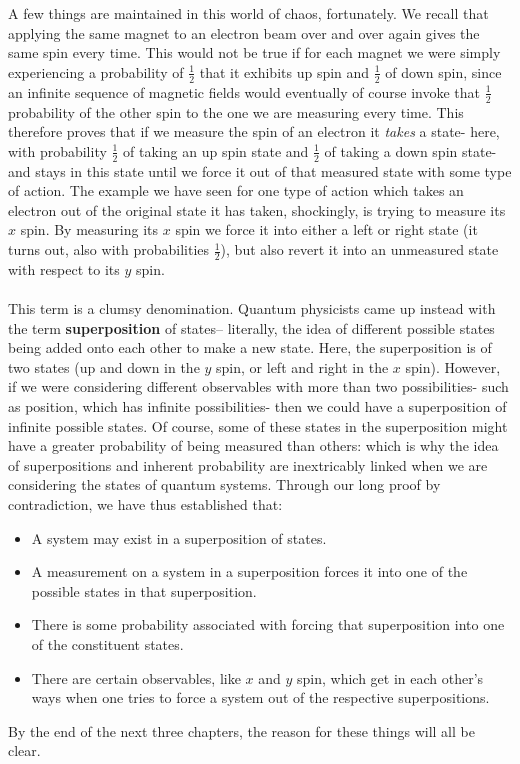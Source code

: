 \\\\
A few things are maintained in this world of chaos, fortunately. We recall that applying the same magnet to an electron beam over and over again gives the same spin every time. This would not be true if for each magnet we were simply experiencing a probability of $\frac{1}{2}$ that it exhibits up spin and $\frac{1}{2}$ of down spin, since an infinite sequence of magnetic fields would eventually of course invoke that $\frac{1}{2}$ probability of the other spin to the one we are measuring every time. This therefore proves that if we measure the spin of an electron it \textit{takes} a state- here, with probability $\frac{1}{2}$ of taking an up spin state and $\frac{1}{2}$ of taking a down spin state- and stays in this state until we force it out of that measured state with some type of action. The example we have seen for one type of action which takes an electron out of the original state it has taken, shockingly, is trying to measure its $x$ spin. By measuring its $x$ spin we force it into either a left or right state (it turns out, also with probabilities $\frac{1}{2}$), but also revert it into an unmeasured state with respect to its $y$ spin. 
\\\\
This term  is a clumsy denomination. Quantum physicists came up instead with the term \textbf{superposition} of states-- literally, the idea of different possible states being added onto each other to make a new state. Here, the superposition is of two states (up and down in the $y$ spin, or left and right in the $x$ spin). However, if we were considering different observables with more than two possibilities- such as position, which has infinite possibilities- then we could have a superposition of infinite possible states. Of course, some of these states in the superposition might have a greater probability of being measured than others: which is why the idea of superpositions and inherent probability are inextricably linked when we are considering the states of quantum systems. Through our long proof by contradiction, we have thus established that:
\begin{itemize}
    \item A system may exist in a superposition of states.
    \item A measurement on a system in a superposition forces it into one of the possible states in that superposition.
    \item There is some probability associated with forcing that superposition into one of the constituent states.
    \item There are certain observables, like $x$ and $y$ spin, which get in each other's ways when one tries to force a system out of the respective superpositions.
\end{itemize}
By the end of the next three chapters, the reason for these things will all be clear. 
